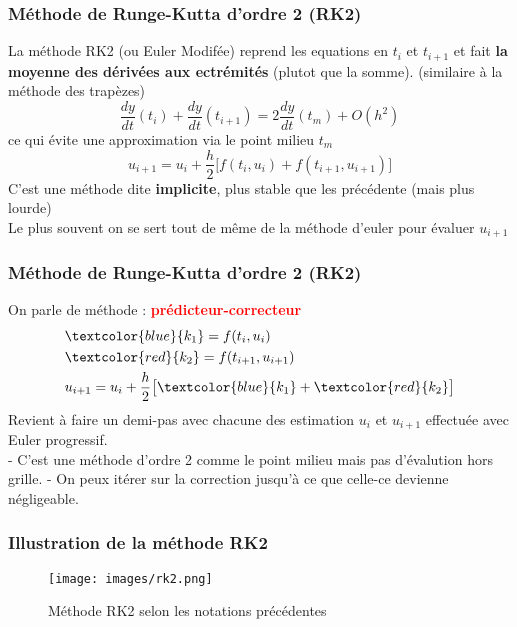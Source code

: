 \documentclass{beamer}
\begin{document}
\begin{frame}
\frametitle{Méthode de Runge-Kutta d'ordre 2 (RK2)}
La méthode RK2 (ou Euler Modifée) reprend les equations en $t_i$ et $t_{i+1}$ et fait \textbf{la moyenne des dérivées aux ectrémités} (plutot que la somme). (similaire à la méthode des trapèzes)
\begin{equation*}
	\frac{dy}{dt}(t_i) + \frac{dy}{dt}(t_{i+1}) = 2\frac{dy}{dt}(t_m) + O(h^2)
\end{equation*}
ce qui évite une approximation via le point milieu $t_m$
\begin{equation*}
	u_{i+1} = u_i + \frac{h}{2} \big[ f(t_i,u_i) + f(t_{i+1},u_{i+1})\big]
\end{equation*}
C'est une méthode dite \textbf{implicite}, plus stable que les précédente (mais plus lourde)\\
Le plus souvent on se sert tout de même de la méthode d'euler pour évaluer $u_{i+1}$

\end{frame}




\begin{frame}
\frametitle{Méthode de Runge-Kutta d'ordre 2 (RK2)}
On parle de méthode : \textbf{\textcolor{red}{prédicteur-correcteur}}
\begin{align*}
& \textcolor{blue}{k_1} = f(t_i, u_i)\\
& \textcolor{red}{k_2} = f(t_{i+1}, u_{i+1})\\
& u_{i+1} = u_i + \frac{h}{2}\big[ \textcolor{blue}{k_1} + \textcolor{red}{k_2}\big]
\end{align*}
Revient à faire un demi-pas avec chacune des estimation $u_i$ et $u_{i+1}$ effectuée avec Euler progressif.\\
\vspace{0.3cm}
- C'est une méthode d'ordre 2 comme le point milieu mais pas d'évalution hors grille.
- On peux itérer sur la correction jusqu'à ce que celle-ce devienne négligeable.
\end{frame}


\begin{frame}
\frametitle{Illustration de la méthode RK2}
\begin{figure}[t]
\texttt{[image: images/rk2.png]}
\caption{\small Méthode RK2 selon les notations précédentes}
\end{figure}
\end{frame}
\end{document}
